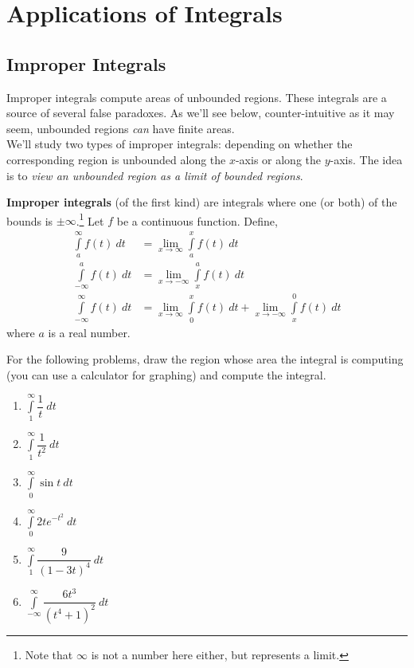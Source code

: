 
\section{Applications of Integrals}

\subsection{Improper Integrals}
Improper integrals compute areas of unbounded regions. These integrals are a source of several false paradoxes. As we'll see below, counter-intuitive as it may seem, unbounded regions {\it can} have finite areas.\\

We'll study two types of improper integrals: depending on whether the corresponding region is unbounded along the $x$-axis or along the $y$-axis.
The idea is to {\it view an unbounded region as a limit of bounded regions}.

\begin{definition}
  {\bf Improper integrals} (of the first kind) are integrals where one (or both) of the bounds is $\pm \infty$.\footnote{Note that $\infty$ is not a number here either, but represents a limit.}
  Let $f$ be a continuous function.
  Define,
	\begin{align*}
		\int \limits_a^{\infty} f(t) \: dt
		 & =
		\lim \limits_{x \rightarrow \infty}\int \limits_a^{x} f(t) \: dt \\
		\int \limits_{-\infty}^a f(t) \: dt
		 & =
		\lim \limits_{x \rightarrow -\infty}\int \limits_{x}^{a} f(t) \: dt \\
		\int \limits_{-\infty}^{\infty} f(t) \: dt
		 & =
		\lim \limits_{x \rightarrow \infty}\int \limits_0^{x} f(t) \: dt
    +
    \lim \limits_{x \rightarrow -\infty}\int \limits_{x}^{0} f(t) \: dt
	\end{align*}
  where $a$ is a real number.
\end{definition}

\begin{exercise}
	For the following problems, draw the region whose area the integral is computing (you can use a calculator for graphing) and compute the integral.
	\begin{multicols}{2}
		\begin{enumerate}
			\item $\int \limits_1^{\infty} \dfrac{1}{t} \: dt$
			\item $\int \limits_1^{\infty} \dfrac{1}{t^2} \: dt$
			\item $\int \limits_0^{\infty} \sin t \: dt$
			\item $\int \limits_0^{\infty} 2t e^{-t^2} \: dt$
			\item $\int \limits_{1}^{\infty} \dfrac{9}{(1 - 3t)^4} \: dt$
			\item $\int \limits_{-\infty}^{\infty} \dfrac{6 t^3}{(t^4 + 1)^2} \: dt$
		\end{enumerate}
	\end{multicols}
\end{exercise}

